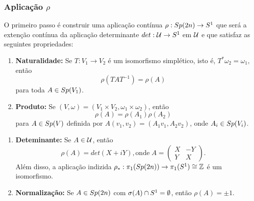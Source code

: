 \documentclass{beamer}
\begin{document}
	\begin{frame}
		\frametitle{Aplicação $\rho$}
		
		O primeiro passo é construir uma aplicação contínua $\rho: Sp(2n)\to S^{1}$ que será a extenção contínua da aplicação determinante $det:\mathcal{U}\to S^{1}$ em $\mathcal{U}$ e que satisfaz as seguintes propriedades:
		
			\begin{enumerate}
				\item \textbf{Naturalidade:}  Se $T:V_{1} \to V_{2}$ é um isomorfismo simplético, isto é, $T^{*}\omega_{2} = \omega_{1}, $então 
				$$
				\rho(TAT^{-1}) = \rho(A)
				$$
				para toda $A\in Sp(V_{1})$.
				
				\item \textbf{Produto:} Se $(V,\omega) = (V_{1}\times V_{2},\omega_{1}\times \omega_{2})$, então
				$$
				\rho(A) = \rho(A_{1})\rho(A_{2})
				$$
				para $A\in Sp(V)$ definida por $A(v_{1}, v_{2})=(A_{1}v_{1}, A_{2}v_{2})$, onde $A_{i} \in Sp(V_{i})$.
				
			
			\end{enumerate}
		
	\end{frame}
	
	\begin{frame}
		\begin{enumerate}
			
			\item \textbf{Deteminante:} Se $A\in \mathcal{U}$, então 
			$$
			\rho(A) = det(X+iY), \text{onde} \;	
			A=\left(
			\begin{array}{cc}
			X & -Y					\\
			Y & X
			\end{array}
			\right).
			$$
			Além disso, a aplicação indizida $\rho_{*}: \pi_{1}(Sp(2n)) \to \pi_{1}(S^{1}) \cong \mathbb{Z}$ é um isomorfismo.
			
			\item \textbf{Normalização:} Se $A \in Sp(2n)$ com $\sigma(A)\cap S^{1} = \emptyset$, então $\rho(A) = \pm 1$.
		\end{enumerate}
	\end{frame}
	
\end{document}
